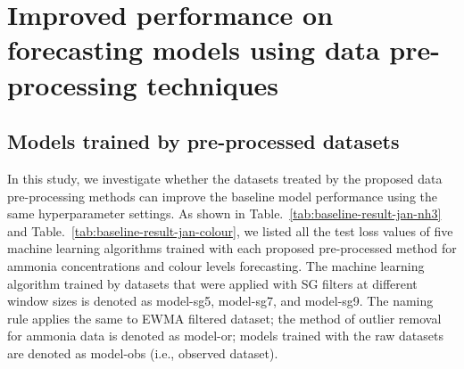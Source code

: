 \section{Improved performance on forecasting models using data pre-processing techniques}
\subsection{Models trained by pre-processed datasets}
In this study, we investigate whether the datasets treated by the proposed data pre-processing methods can improve the baseline model performance using the same hyperparameter settings. As shown in Table.~\ref{tab:baseline-result-jan-nh3} and Table.~\ref{tab:baseline-result-jan-colour}, we listed all the test loss values of five machine learning algorithms trained with each proposed pre-processed method for ammonia concentrations and colour levels forecasting. The machine learning algorithm trained by datasets that were applied with SG filters at different window sizes is denoted as model-sg5, model-sg7, and model-sg9. The naming rule applies the same to EWMA filtered dataset; the method of outlier removal for ammonia data is denoted as model-or; models trained with the raw datasets are denoted as model-obs (i.e., observed dataset).

